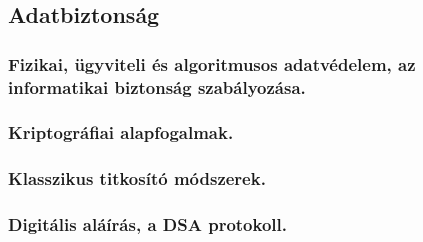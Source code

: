 \subsection{Adatbiztonság}
\subsubsection{Fizikai, ügyviteli és algoritmusos adatvédelem, az informatikai biztonság szabályozása.}

\subsubsection{Kriptográfiai alapfogalmak.}

\subsubsection{Klasszikus titkosító módszerek.}

\subsubsection{Digitális aláírás, a DSA protokoll.}
